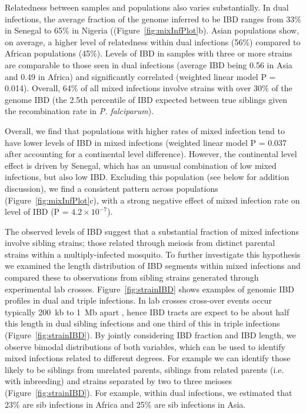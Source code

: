 \documentclass[9pt,lineno]{elife}
\begin{document}
Relatedness between samples and populations also varies substantially.  In dual infections, the average fraction of the genome inferred to be IBD ranges from 33\% in Senegal to 65\% in Nigeria ((Figure~\ref{fig:mixInfPlot}b).   Asian populations show, on average, a higher level of relatedness within dual infections (56\%) compared to African populations (45\%).  Levels of IBD in samples with three or more strains are comparable to those seen in dual infections (average IBD being 0.56 in Asia and 0.49 in Africa) and significantly correlated (weighted linear model P = 0.014).  Overall, 64\% of all mixed infections involve strains with over 30\% of the genome IBD (the 2.5th percentile of IBD expected between true siblings given the recombination rate in {\it P. falciparum}).

Overall, we find that populations with higher rates of mixed infection tend to have lower levels of IBD in mixed infections (weighted linear model P = 0.037 after accounting for a continental level difference).  However, the continental level effect is driven by Senegal, which has an unusual combination of low mixed infections, but also low IBD.  Excluding this population (see below for addition discussion), we find a consistent pattern across populations (Figure~\ref{fig:mixInfPlot}c), with a strong negative effect of mixed infection rate on level of IBD (P = $4.2\times10^{-7}$).

The observed levels of IBD suggest that a substantial fraction of mixed infections involve sibling strains; those related through meiosis from distinct parental strains within a multiply-infected mosquito.  To further investigate this hypothesis we examined the length distribution of IBD segments within mixed infections and compared these to observations from sibling strains generated through experimental lab crosses.  Figure~\ref{fig:strainIBD} shows examples of genomic IBD profiles in dual and triple infections.  In lab crosses cross-over events occur typically 200~kb to 1~Mb apart \citet{Miles2016}, hence IBD tracts are expect to be about half this length in dual sibling infections and one third of this in triple infections (Figure~\ref{fig:strainIBD}).  By jointly considering IBD fraction and IBD length, we observe bimodal distributions of both variables, which can be used to identify mixed infections related to different degrees.  For example we can identify those likely to be siblings from unrelated parents, siblings from related parents (i.e. with inbreeding) and strains separated by two to three meioses (Figure~\ref{fig:strainIBD}).  For example, within dual infections, we estimated that 23\% are sib infections in Africa and 25\% are sib infections in Asia.
\end{document}
